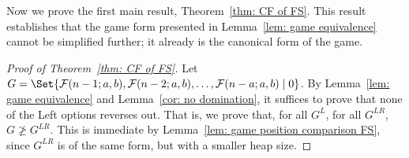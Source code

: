\documentclass[oneside,reqno]{amsart}
\newcommand{\fs}{\mathcal{F}}
\begin{document}
Now we prove the first main result, Theorem~\ref{thm: CF of FS}. This result establishes that the game form presented in Lemma~\ref{lem: game equivalence} cannot be simplified further; it already is the canonical form of the game.


\begin{proof}[Proof of Theorem~\ref{thm: CF of FS}]
Let $G=\Set{\fs(n-1;a,b), \fs(n-2;a,b),\dots,\fs(n-a;a,b)\mid 0}$. By Lemma~\ref{lem: game equivalence} and Lemma~\ref{cor: no domination}, it suffices to prove that none of the Left options reverses out. That is, we prove that, for all $G^L$, for all $G^{LR}$, $G\ngeq G^{LR}$. This is immediate by Lemma~\ref{lem: game position comparison FS}, since $G^{LR}$ is of the same form, but with a smaller heap size.   
\end{proof}
\end{document}
